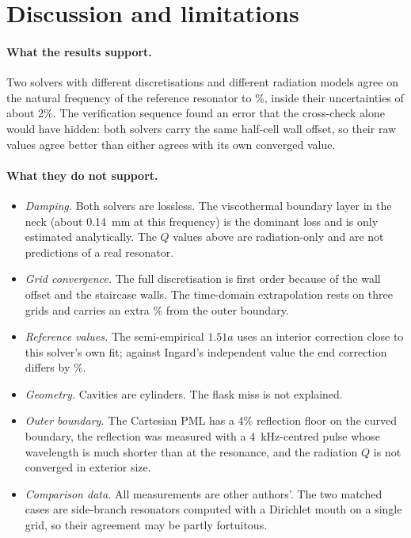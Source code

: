\documentclass[11pt,a4paper]{article}
\begin{document}
\section{Discussion and limitations}

\paragraph{What the results support.} Two solvers with different discretisations and
different radiation models agree on the natural frequency of the reference resonator to
\solverGap\%, inside their uncertainties of about 2\%. The verification sequence found an
error that the cross-check alone would have hidden: both solvers carry the same half-cell
wall offset, so their raw values agree better than either agrees with its own converged
value.

\paragraph{What they do not support.}
\begin{itemize}
  \item \emph{Damping.} Both solvers are lossless. The viscothermal boundary layer in the
    neck (about 0.14~mm at this frequency) is the dominant loss and is only estimated
    analytically. The $Q$ values above are radiation-only and are not predictions of a real
    resonator.
  \item \emph{Grid convergence.} The full discretisation is first order because of the wall
    offset and the staircase walls. The time-domain extrapolation rests on three grids and
    carries an extra \fZeroSpread\% from the outer boundary.
  \item \emph{Reference values.} The semi-empirical $1.51a$ uses an interior correction close
    to this solver's own fit; against Ingard's independent value the end correction differs
    by \dLextGapIngard\%.
  \item \emph{Geometry.} Cavities are cylinders. The flask miss is not explained.
  \item \emph{Outer boundary.} The Cartesian PML has a 4\% reflection floor on the curved
    boundary, the reflection was measured with a 4~kHz-centred pulse whose wavelength is much
    shorter than at the resonance, and the radiation $Q$ is not converged in exterior size.
  \item \emph{Comparison data.} All measurements are other authors'. The two matched cases
    are side-branch resonators computed with a Dirichlet mouth on a single grid, so their
    agreement may be partly fortuitous.
\end{itemize}
\end{document}
